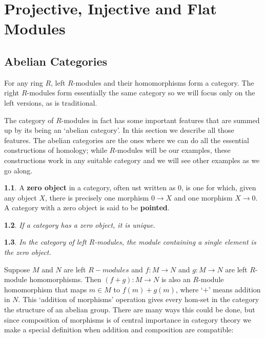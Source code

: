\documentclass[oneside,english]{amsbook}
\numberwithin{section}{chapter}
\theoremstyle{plain}
\newtheorem{thm}{\protect\theoremname}
\theoremstyle{definition}
\newtheorem{defn}[thm]{\protect\definitionname}
\providecommand{\definitionname}{Definition}
\providecommand{\theoremname}{Theorem}
\begin{document}
	\chapter{Projective, Injective and Flat Modules}

		\section{Abelian Categories}
	
			For any ring $R$, left $R$-modules and their homomorphisms form a category. The right $R$-modules form essentially the same category so we will focus only on the left versions, as is traditional.
			
			The category of $R$-modules in fact has some important features that are summed up by its being an `abelian category'. In this section we describe all those features. The abelian categories are the ones where we can do all the essential constructions of homology; while $R$-modules will be our examples, these constructions work in any suitable category and we will see other examples as we go along.
	
			\begin{defn}
				A \textbf{zero object} in a category, often ust written as $0$, is one for which, given any object $X$, there is precisely one morphism $0\to X$ and one morphism $X\to 0$. A category with a zero object is said to be \textbf{pointed}.
			\end{defn}
			
			\begin{thm}
				If a category has a zero object, it is unique.
			\end{thm}
			
			\begin{thm}
				In the category of left $R$-modules, the module containing a single element is the zero object.
			\end{thm}
		
			Suppose $M$ and $N$ are left $R-modules$ and $f:M\to N$ and $g:M\to N$ are left $R$-module homomorphisms. Then $(f+g):M\to N$ is also an $R$-module homomorphism that maps $m\in M$ to $f(m) + g(m)$, where `$+$' means addition in $N$. This `addition of morphisms' operation gives every hom-set in the category the structure of an abelian group. There are many ways this could be done, but since composition of morphisms is of central importance in category theory we make a special definition when addition and composition are compatible:
\end{document}
